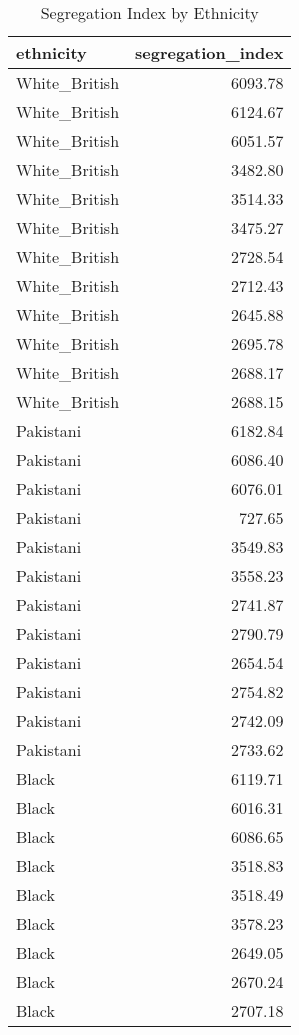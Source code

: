 \documentclass[
]{article}
\begin{document}
\begin{table}

\caption{\label{tab:segregation-index}Segregation Index by Ethnicity}
\centering
\begin{tabular}[t]{l|r}
\hline
ethnicity & segregation\_index\\
\hline
White\_British & 6093.78\\
\hline
White\_British & 6124.67\\
\hline
White\_British & 6051.57\\
\hline
White\_British & 3482.80\\
\hline
White\_British & 3514.33\\
\hline
White\_British & 3475.27\\
\hline
White\_British & 2728.54\\
\hline
White\_British & 2712.43\\
\hline
White\_British & 2645.88\\
\hline
White\_British & 2695.78\\
\hline
White\_British & 2688.17\\
\hline
White\_British & 2688.15\\
\hline
Pakistani & 6182.84\\
\hline
Pakistani & 6086.40\\
\hline
Pakistani & 6076.01\\
\hline
Pakistani & 727.65\\
\hline
Pakistani & 3549.83\\
\hline
Pakistani & 3558.23\\
\hline
Pakistani & 2741.87\\
\hline
Pakistani & 2790.79\\
\hline
Pakistani & 2654.54\\
\hline
Pakistani & 2754.82\\
\hline
Pakistani & 2742.09\\
\hline
Pakistani & 2733.62\\
\hline
Black & 6119.71\\
\hline
Black & 6016.31\\
\hline
Black & 6086.65\\
\hline
Black & 3518.83\\
\hline
Black & 3518.49\\
\hline
Black & 3578.23\\
\hline
Black & 2649.05\\
\hline
Black & 2670.24\\
\hline
Black & 2707.18\\

\end{tabular}
\end{table}
\end{document}
